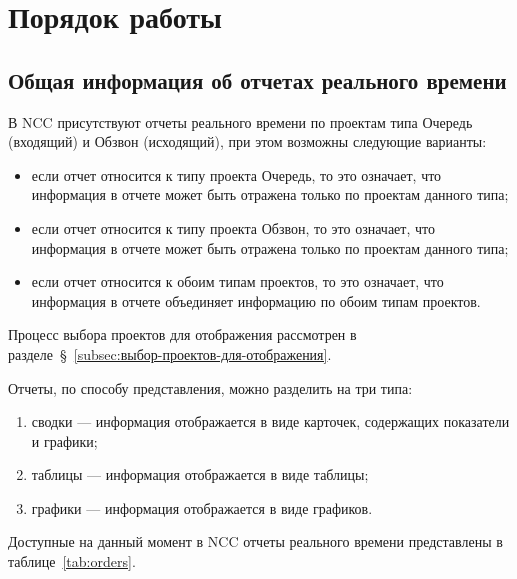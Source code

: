 \section{Порядок работы}

\subsection{Общая информация об отчетах реального времени}

В NCC присутствуют отчеты реального времени по проектам типа Очередь (входящий) и Обзвон (исходящий), при этом возможны следующие варианты:
\begin{itemize}
    \item если отчет относится к типу проекта Очередь, то это означает, что информация в отчете может быть отражена
    только по проектам данного типа;
    \item если отчет относится к типу проекта Обзвон,
    то это означает, что информация в отчете может быть отражена только по проектам данного типа;
    \item если отчет относится к обоим типам проектов, то это означает, что информация в отчете объединяет информацию по обоим типам проектов.
\end{itemize}

Процесс выбора проектов для отображения рассмотрен в разделе~\S~\ref{subsec:выбор-проектов-для-отображения}.

Отчеты, по способу представления, можно разделить на три типа:
\begin{enumerate}[1)]
    \item сводки --- информация отображается в виде карточек, содержащих показатели и графики;
    \item таблицы --- информация отображается в виде таблицы;
    \item графики --- информация отображается в виде графиков.
\end{enumerate}

Доступные на данный момент в NCC отчеты реального времени представлены в таблице~\ref{tab:orders}.

